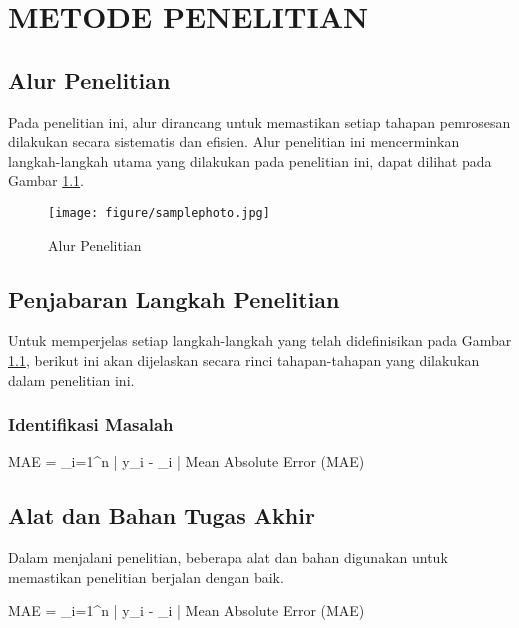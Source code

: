 \newpage
\chapter{METODE PENELITIAN} \label{Bab III}

\section{Alur Penelitian} \label{III.Alur}
Pada penelitian ini, alur dirancang untuk memastikan setiap tahapan pemrosesan dilakukan secara sistematis dan efisien. Alur penelitian ini mencerminkan langkah-langkah utama yang dilakukan pada penelitian ini, dapat dilihat pada Gambar \ref{fig:3.alur}. \par

\begin{figure}[H] %
    \centering
    \texttt{[image: figure/samplephoto.jpg]}
    \caption{Alur Penelitian}
    \label{fig:3.alur}
\end{figure}

\section{Penjabaran Langkah Penelitian} \label{III.Jabar Alur}
Untuk memperjelas setiap langkah-langkah yang telah didefinisikan pada Gambar \ref{fig:3.alur}, berikut ini akan dijelaskan secara rinci tahapan-tahapan yang dilakukan dalam penelitian ini.

\subsection{Identifikasi Masalah} \label{III.Identifikasi_masalah}
\lipsum[1] %
\begin{equationcaptioned}[eq:3.mae]{
		MAE =  \sum_{i=1}^{n} \left| y_i - _i \right|
	}{
		Mean Absolute Error (MAE)
	}
\end{equationcaptioned}

\section{Alat dan Bahan Tugas Akhir} \label{III.Alat dan Bahan}
Dalam menjalani penelitian, beberapa alat dan bahan digunakan untuk memastikan penelitian berjalan dengan baik.\par
\begin{equationcaptioned}[eq:3.mae2]{
		MAE =  \sum_{i=1}^{n} \left| y_i - _i \right|
	}{
		Mean Absolute Error (MAE)
	}
\end{equationcaptioned}

